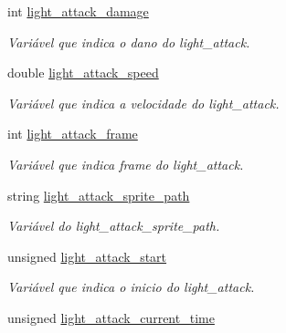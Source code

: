 \begin{DoxyCompactItemize}
int \mbox{\hyperlink{classLightAttack_a33ff61300d69a5227cdc7a41c4de9a61}{light\+\_\+attack\+\_\+damage}}
\begin{DoxyCompactList}\small\item\em Variável que indica o dano do light\+\_\+attack. \end{DoxyCompactList}\item 
\mbox{\label{classLightAttack_a2020d5cc3d91c3f4c597e50bfb249d19}} 
double \mbox{\hyperlink{classLightAttack_a2020d5cc3d91c3f4c597e50bfb249d19}{light\+\_\+attack\+\_\+speed}}
\begin{DoxyCompactList}\small\item\em Variável que indica a velocidade do light\+\_\+attack. \end{DoxyCompactList}\item 
\mbox{\label{classLightAttack_a28c2ddb59b87f80ab69c6b4676395bf8}} 
int \mbox{\hyperlink{classLightAttack_a28c2ddb59b87f80ab69c6b4676395bf8}{light\+\_\+attack\+\_\+frame}}
\begin{DoxyCompactList}\small\item\em Variável que indica frame do light\+\_\+attack. \end{DoxyCompactList}\item 
\mbox{\label{classLightAttack_a252572bfbcf4d80aca70f11e3dc3a4bd}} 
string \mbox{\hyperlink{classLightAttack_a252572bfbcf4d80aca70f11e3dc3a4bd}{light\+\_\+attack\+\_\+sprite\+\_\+path}}
\begin{DoxyCompactList}\small\item\em Variável do light\+\_\+attack\+\_\+sprite\+\_\+path. \end{DoxyCompactList}\item 
\mbox{\label{classLightAttack_af67aff57a2acdac82b0d0a090af783d7}} 
unsigned \mbox{\hyperlink{classLightAttack_af67aff57a2acdac82b0d0a090af783d7}{light\+\_\+attack\+\_\+start}}
\begin{DoxyCompactList}\small\item\em Variável que indica o inicio do light\+\_\+attack. \end{DoxyCompactList}\item 
\mbox{\label{classLightAttack_aee4f749c8ca775a69cd4131c19161f02}} 
unsigned \mbox{\hyperlink{classLightAttack_aee4f749c8ca775a69cd4131c19161f02}{light\+\_\+attack\+\_\+current\+\_\+time}}

\end{DoxyCompactItemize}
